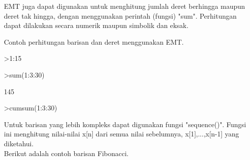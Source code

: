 \documentclass[a4paper,10pt]{article}
\begin{document}
\begin{eulernotebook}
\begin{eulercomment}
\begin{eulercomment}
\begin{eulercomment}
\begin{eulercomment}
\begin{eulercomment}
\begin{eulercomment}
\begin{eulercomment}
\begin{eulercomment}
\begin{eulercomment}
\begin{eulercomment}
\begin{eulercomment}
\begin{eulercomment}
\begin{eulercomment}
\begin{eulercomment}
\begin{eulercomment}
\begin{eulercomment}
\begin{eulercomment}
\begin{eulercomment}
\begin{eulercomment}
\begin{eulercomment}
\begin{eulercomment}
\begin{eulercomment}
\begin{eulercomment}
\begin{eulercomment}
\begin{eulercomment}
EMT juga dapat digunakan untuk menghitung jumlah deret berhingga
maupun deret tak hingga, dengan menggunakan perintah (fungsi) "sum".
Perhitungan dapat dilakukan secara numerik maupun simbolik dan eksak.

Contoh perhitungan barisan dan deret menggunakan EMT.

\end{eulercomment}
\begin{eulerprompt}
>1:15
\end{eulerprompt}
\begin{euleroutput}
  [1,  2,  3,  4,  5,  6,  7,  8,  9,  10,  11,  12,  13,  14,  15]
\end{euleroutput}
\begin{eulerprompt}
>sum(1:3:30)
\end{eulerprompt}
\begin{euleroutput}
  145
\end{euleroutput}
\begin{eulerprompt}
>cumsum(1:3:30)
\end{eulerprompt}
\begin{euleroutput}
  [1,  5,  12,  22,  35,  51,  70,  92,  117,  145]
\end{euleroutput}
\begin{eulercomment}
Untuk barisan yang lebih kompleks dapat digunakan fungsi "sequence()".
Fungsi ini menghitung nilai-nilai x[n] dari semua nilai sebelumnya,
x[1],...,x[n-1] yang diketahui.\\
Berikut adalah contoh barisan Fibonacci.


\end{eulercomment}
\end{eulercomment}
\end{eulercomment}
\end{eulercomment}
\end{eulercomment}
\end{eulercomment}
\end{eulercomment}
\end{eulercomment}
\end{eulercomment}
\end{eulercomment}
\end{eulercomment}
\end{eulercomment}
\end{eulercomment}
\end{eulercomment}
\end{eulercomment}
\end{eulercomment}
\end{eulercomment}
\end{eulercomment}
\end{eulercomment}
\end{eulercomment}
\end{eulercomment}
\end{eulercomment}
\end{eulercomment}
\end{eulercomment}
\end{eulercomment}
\end{eulernotebook}
\end{document}
